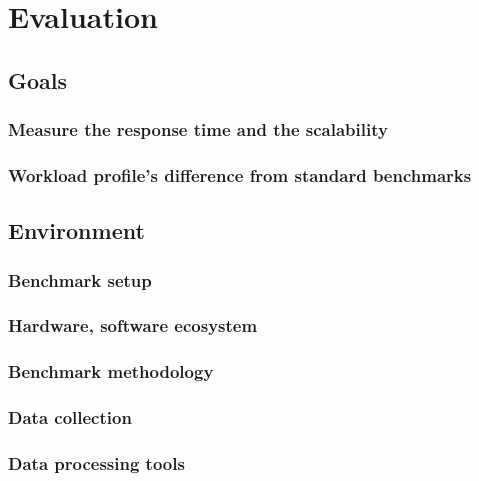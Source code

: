 \chapter{Evaluation}
\label{chap:evaluation}

\section{Goals}

\subsection{Measure the response time and the scalability}

\subsection{Workload profile's difference from standard benchmarks}

\section{Environment}


\subsection{Benchmark setup}


\subsection{Hardware, software ecosystem}

\subsection{Benchmark methodology}

\subsection{Data collection}

\subsection{Data processing tools}

